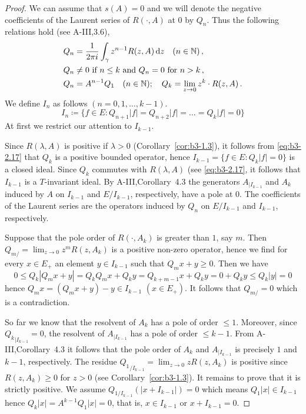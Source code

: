 \begin{proof}
	We can assume that $s(A) = 0$ and we will denote the negative coefficients of the Laurent series of $R(\cdot,A)$ at $0$ by $Q_{n}$.
	Thus the following relations hold (see A-III,3.6),
	\begin{equation}\label{eq:b3-2.17}
	\begin{split}
		Q_{n} &= \frac{1}{2\pi i}\int_{\gamma} z^{n-1}R(z,A)  \mathop{}\!\mathrm{d}{z} \quad (n \in \mathbb{N})\,, \\
		Q_{n} &\neq 0 \text{ if } n \leq k \text{ and } Q_{n} = 0 \text{ for } n > k\,, \\
		Q_{n} &= A^{n-1}Q_{1} \quad (n \in \mathbb{N}); \quad Q_{k} = \lim_{z \to 0}z^{k}\cdot R(z,A)\,.
	\end{split}
	\end{equation}
	We define $I_{n}$ as follows $(n = 0,1,\ldots,k-1)$.
	\[
	I_{n} \coloneqq \{f \in E \colon Q_{n+1}|f| = Q_{n+2}|f| = \ldots = Q_{k}|f| = 0\}
	\]
	At first we restrict our attention to $I_{k-1}$.
	
	Since $R(\lambda,A)$ is positive if $\lambda > 0$ (Corollary~\ref{cor:b3-1.3}), it follows from \eqref{eq:b3-2.17} that $Q_{k}$ is a positive bounded operator, hence $I_{k-1} = \{f \in E \colon Q_{k}|f| = 0\}$ is a closed ideal.
	Since $Q_{k}$ commutes with $R(\lambda,A)$ (see \eqref{eq:b3-2.17}, it follows that $I_{k-1}$ is a $T$-invariant ideal.
	By A-III,Corollary~4.3 the generators $A_{|I_{k-1}}$ and $A_{k}$ induced by $A$ on $I_{k-1}$ and $E/I_{k-1}$, respectively, have a pole at $0$.
	The coefficients of the Laurent series are the operators induced by $Q_{n}$ on $E/I_{k-1}$ and $I_{k-1}$, respectively.
	
	Suppose that the pole order of $R(\cdot,A_{k})$ is greater than $1$, say $m$.
	Then $Q_{m/} = \lim_{z \to 0}z^{m}R(z,A_{k})$ is a positive non-zero operator, hence we find for every $x \in E_{+}$ an element $y \in I_{k-1}$ such that $Q_{m}x + y \geq 0$.
	Then we have
	\[
	0 \leq Q_{k}|Q_{m}x + y| = Q_{k}Q_{m}x + Q_{k}y = Q_{k+m-1}x + Q_{k}y = 0 + Q_{k}y \leq Q_{k}|y| = 0
	\]
	hence $Q_{m}x = (Q_{m}x + y) - y \in I_{k-1}$ $(x \in E_{+})$.
	It follows that $Q_{m/} = 0$ which is a contradiction.
	
	So far we know that the resolvent of $A_{k}$ has a pole of order $\leq 1$.
	Moreover, since ${Q_{k}}_{|I_{k-1}} = 0$, 
	the resolvent of $A_{|I_{k-1}}$ has a pole of order $\leq k-1$.
	From A-III,Corollary~4.3 it follows that the pole order of $A_{k}$ and $A_{|I_{k-1}}$ is precisely $1$ and $k-1$, respectively.
	The residue ${Q_{1}}_{/I_{k-1}} = \lim_{z \to 0}zR(z,A_{k})$ is positive since $R(z,A_{k}) \geq 0$ for $z > 0$ (see Corollary~\ref{cor:b3-1.3}).
	It remains to prove that it is strictly positive. We assume $Q_{1/I_{k-1}}(|x + I_{k-1}|) = 0$ which means $Q_{1}|x| \in I_{k-1}$ hence $Q_{k}|x| = A^{k-1}Q_{1}|x| = 0$, that is, $x \in I_{k-1}$ or $x + I_{k-1} = 0$.
	

\end{proof}
